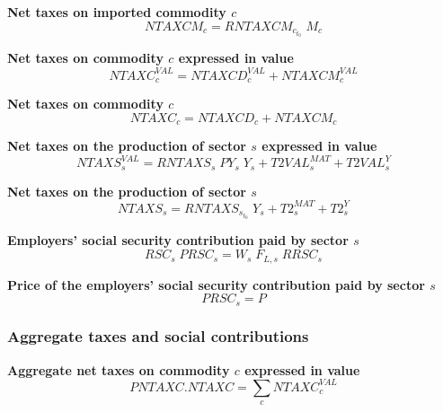 \documentclass[12pt]{article}
\numberwithin{equation}{section}
\begin{document}
\noindent \textbf{Net taxes on imported commodity $c$} 
\begin{dmath}
NTAXCM_{c} = RNTAXCM_{c}_{t_0} \; M_{c}
\label{government.mdlNTAXCM[c]}
\end{dmath}

\noindent \textbf{Net taxes on commodity $c$ expressed in value} 
\begin{dmath}
NTAXC^{VAL}_{c} = NTAXCD^{VAL}_{c} + NTAXCM^{VAL}_{c}
\label{government.mdlNTAXC_VAL[c]}
\end{dmath}

\noindent \textbf{Net taxes on commodity $c$} 
\begin{dmath}
NTAXC_{c} = NTAXCD_{c} + NTAXCM_{c}
\label{government.mdlNTAXC[c]}
\end{dmath}

\noindent \textbf{Net taxes on the production of sector $s$ expressed in value} 
\begin{dmath}
NTAXS^{VAL}_{s} = RNTAXS_{s} \; PY_{s} \; Y_{s} + T2VAL^{MAT}_{s} + T2VAL^{Y}_{s}
\label{government.mdlNTAXS_VAL[s]}
\end{dmath}

\noindent \textbf{Net taxes on the production of sector $s$} 
\begin{dmath}
NTAXS_{s} = RNTAXS_{s}_{t_0} \; Y_{s} + T2^{MAT}_{s} + T2^{Y}_{s}
\label{government.mdlNTAXS[s]}
\end{dmath}

\noindent \textbf{Employers' social security contribution paid by sector $s$} 
\begin{dmath}
RSC_{s} \; PRSC_{s} = W_{s} \; F_{L, s} \; RRSC_{s}
\label{government.mdlRSC[s]}
\end{dmath}

\noindent \textbf{Price of the employers' social security contribution paid by sector $s$} 
\begin{dmath}
PRSC_{s} = P
\label{government.mdlPRSC[s]}
\end{dmath}



\subsubsection{Aggregate taxes and social contributions}



\noindent \textbf{Aggregate net taxes on commodity $c$ expressed in value} 
\begin{dmath}
PNTAXC . NTAXC = \sum_{c} NTAXC^{VAL}_{c}
\label{government.mdlPNTAXC}
\end{dmath}
\end{document}
